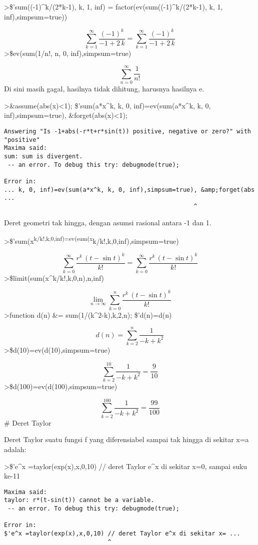 \documentclass[
]{book}
\begin{document}
\textgreater\$'sum((-1)\^{}k/(2*k-1), k, 1, inf) = factor(ev(sum((-1)\^{}k/(2*k-1), k, 1, inf),simpsum=true))

\[\sum_{k=1}^{\infty }{\frac{\left(-1\right)^{k}}{-1+2\,k}}=\sum_{k=1 }^{\infty }{\frac{\left(-1\right)^{k}}{-1+2\,k}}\]\textgreater\$ev(sum(1/n!, n, 0, inf),simpsum=true)

\[\sum_{n=0}^{\infty }{\frac{1}{n!}}\]Di sini masih gagal, hasilnya tidak dihitung, harusnya hasilnya e.

\textgreater\&assume(abs(x)\textless1); \$'sum(a*x\^{}k, k, 0, inf)=ev(sum(a*x\^{}k, k, 0, inf),simpsum=true), \&forget(abs(x)\textless1);

\begin{verbatim}
Answering "Is -1+abs(-r*t+r*sin(t)) positive, negative or zero?" with "positive"
Maxima said:
sum: sum is divergent.
 -- an error. To debug this try: debugmode(true);

Error in:
... k, 0, inf)=ev(sum(a*x^k, k, 0, inf),simpsum=true), &amp;forget(abs ...
                                                     ^
\end{verbatim}

Deret geometri tak hingga, dengan asumsi rasional antara -1 dan 1.

\textgreater\$'sum(x\textsuperscript{k/k!,k,0,inf)=ev(sum(x}k/k!,k,0,inf),simpsum=true)

\[\sum_{k=0}^{\infty }{\frac{r^{k}\,\left(t-\sin t\right)^{k}}{k!}}= \sum_{k=0}^{\infty }{\frac{r^{k}\,\left(t-\sin t\right)^{k}}{k!}}\]\textgreater\$limit(sum(x\^{}k/k!,k,0,n),n,inf)

\[\lim_{n\rightarrow \infty }{\sum_{k=0}^{n}{\frac{r^{k}\,\left(t- \sin t\right)^{k}}{k!}}}\]\textgreater function d(n) \&= sum(1/(k\^{}2-k),k,2,n); \$'d(n)=d(n)

\[d\left(n\right)=\sum_{k=2}^{n}{\frac{1}{-k+k^2}}\]\textgreater\$d(10)=ev(d(10),simpsum=true)

\[\sum_{k=2}^{10}{\frac{1}{-k+k^2}}=\frac{9}{10}\]\textgreater\$d(100)=ev(d(100),simpsum=true)

\[\sum_{k=2}^{100}{\frac{1}{-k+k^2}}=\frac{99}{100}\]\# Deret Taylor

Deret Taylor suatu fungsi f yang diferensiabel sampai tak hingga di sekitar x=a adalah:

\textgreater\$'e\^{}x =taylor(exp(x),x,0,10) // deret Taylor e\^{}x di sekitar x=0, sampai suku ke-11

\begin{verbatim}
Maxima said:
taylor: r*(t-sin(t)) cannot be a variable.
 -- an error. To debug this try: debugmode(true);

Error in:
$'e^x =taylor(exp(x),x,0,10) // deret Taylor e^x di sekitar x= ...
                             ^
\end{verbatim}
\end{document}
